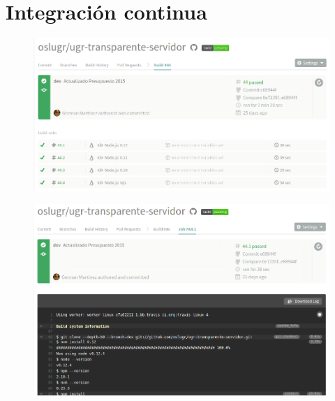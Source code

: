 \section{Integración continua}

\begin{figure}[!ht]
	\begin{center}
		\includegraphics[width=1\textwidth]{../images/integracion_continua_01.png}
		\caption{}
		\label{fig:integracion_continua_01}
	\end{center}
\end{figure}

\begin{figure}[!ht]
	\begin{center}
		\includegraphics[width=1\textwidth]{../images/integracion_continua_02.png}
		\caption{}
		\label{fig:integracion_continua_02}
	\end{center}
\end{figure}

